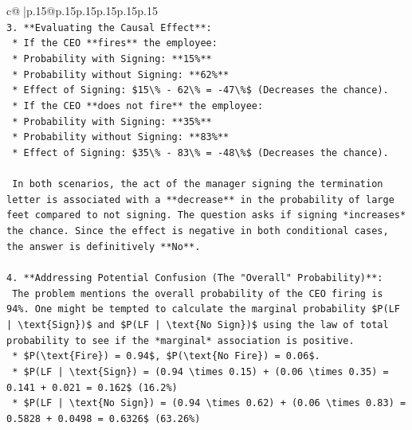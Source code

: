 \documentclass{article}
\begin{document}
{\begin{supertabular}{c@{$\;$}|p{.15\linewidth}@{}p{.15\linewidth}p{.15\linewidth}p{.15\linewidth}p{.15\linewidth}p{.15\linewidth}}
{{{\\ 
\texttt{3.  **Evaluating the Causal Effect**:} \\
\texttt{    *   If the CEO **fires** the employee:} \\
\texttt{        *   Probability with Signing: **15\%**} \\
\texttt{        *   Probability without Signing: **62\%**} \\
\texttt{        *   Effect of Signing: \$15\textbackslash{}\% {-} 62\textbackslash{}\% = {-}47\textbackslash{}\%\$ (Decreases the chance).} \\
\texttt{    *   If the CEO **does not fire** the employee:} \\
\texttt{        *   Probability with Signing: **35\%**} \\
\texttt{        *   Probability without Signing: **83\%**} \\
\texttt{        *   Effect of Signing: \$35\textbackslash{}\% {-} 83\textbackslash{}\% = {-}48\textbackslash{}\%\$ (Decreases the chance).} \\
\\ 
\texttt{    In both scenarios, the act of the manager signing the termination letter is associated with a **decrease** in the probability of large feet compared to not signing. The question asks if signing *increases* the chance. Since the effect is negative in both conditional cases, the answer is definitively **No**.} \\
\\ 
\texttt{4.  **Addressing Potential Confusion (The "Overall" Probability)**:} \\
\texttt{    The problem mentions the overall probability of the CEO firing is 94\%. One might be tempted to calculate the marginal probability \$P(LF | \textbackslash{}text\{Sign\})\$ and \$P(LF | \textbackslash{}text\{No Sign\})\$ using the law of total probability to see if the *marginal* association is positive.} \\
\texttt{    *   \$P(\textbackslash{}text\{Fire\}) = 0.94\$, \$P(\textbackslash{}text\{No Fire\}) = 0.06\$.} \\
\texttt{    *   \$P(LF | \textbackslash{}text\{Sign\}) = (0.94 \textbackslash{}times 0.15) + (0.06 \textbackslash{}times 0.35) = 0.141 + 0.021 = 0.162\$ (16.2\%)} \\
\texttt{    *   \$P(LF | \textbackslash{}text\{No Sign\}) = (0.94 \textbackslash{}times 0.62) + (0.06 \textbackslash{}times 0.83) = 0.5828 + 0.0498 = 0.6326\$ (63.26\%)} \\
}}}
\end{supertabular}}
\end{document}
